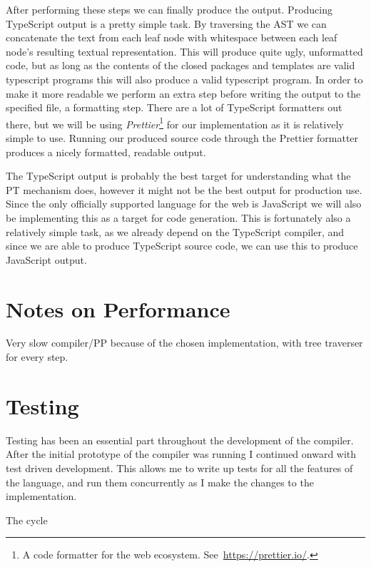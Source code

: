 After performing these steps we can finally produce the output.
Producing TypeScript output is a pretty simple task.
By traversing the AST we can concatenate the text from each leaf node with whitespace between each leaf node's resulting textual representation.
This will produce quite ugly, unformatted code, but as long as the contents of the closed packages and templates are valid typescript programs this will also produce a valid typescript program.
In order to make it more readable we perform an extra step before writing the output to the specified file, a formatting step.
There are a lot of TypeScript formatters out there, but we will be using \textit{Prettier}\footnote{A code formatter for the web ecosystem. See~\url{https://prettier.io/}.} for our implementation as it is relatively simple to use.
Running our produced source code through the Prettier formatter produces a nicely formatted, readable output.

The TypeScript output is probably the best target for understanding what the PT mechanism does, however it might not be the best output for production use.
Since the only officially supported language for the web is JavaScript we will also be implementing this as a target for code generation.
This is fortunately also a relatively simple task, as we already depend on the TypeScript compiler, and since we are able to produce TypeScript source code, we can use this to produce JavaScript output.

\section{Notes on Performance}\label{sec:notes-on-performance}

Very slow compiler/PP because of the chosen implementation, with tree traverser for every step.


\section{Testing}\label{sec:testing}

Testing has been an essential part throughout the development of the compiler.
After the initial prototype of the compiler was running I continued onward with test driven development.
This allows me to write up tests for all the features of the language, and run them concurrently as I make the changes to the implementation.

The cycle

